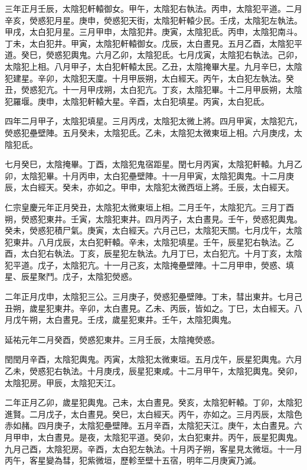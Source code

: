 \begin{pinyinscope}
 三年正月壬辰，太陰犯軒轅御女。甲午，太陰犯右執法。丙申，太陰犯平道。二月辛亥，熒惑犯月星。庚申，熒惑犯天街，太陰犯軒轅少民。壬戌，太陰犯左執法。甲戌，太白犯月星。三月甲申，太陰犯井。庚寅，太陰犯氐。丙申，太陰犯南斗。丁未，太白犯井。甲寅，太陰犯軒轅御女。戊辰，太白晝見。五月乙酉，太陰犯平道。癸巳，熒惑犯輿鬼。六月乙卯，太陰犯氐。七月戊寅，太陰犯右執法。己卯，太陰犯上相。八月甲子，太白犯軒轅太民。乙丑，太陰掩畢大星。九月辛巳，太陰犯建星。辛卯，太陰犯天廩。十月甲辰朔，太白經天。丙午，太白犯左執法。癸丑，熒惑犯亢。十一月甲戌朔，太白犯亢。丁亥，太陰犯畢。十二月甲辰朔，太陰犯羅堰。庚申，太陰犯軒轅大星。辛酉，太白犯填星。丙寅，太白犯氐。



 四年二月甲子，太陰犯填星。三月丙戌，太陰犯太微上將。四月甲寅，太陰犯亢，熒惑犯壘壁陣。五月癸未，太陰犯氐。乙未，太陰犯太微東垣上相。六月庚戌，太陰犯氐。



 七月癸巳，太陰掩畢。丁酉，太陰犯鬼宿距星。閏七月丙寅，太陰犯軒轅。九月乙卯，太陰犯畢。十月丙申，太白犯壘壁陣。十一月甲寅，太陰犯輿鬼。十二月庚辰，太白經天。癸未，亦如之。甲申，太陰犯太微西垣上將。壬辰，太白經天。



 仁宗皇慶元年正月癸丑，太陰犯太微東垣上相。二月壬午，太陰犯亢。三月丁酉朔，熒惑犯東井。壬寅，太陰犯東井。四月丙子，太白晝見。壬午，熒惑犯輿鬼。癸未，熒惑犯積尸氣。庚寅，太白經天。六月己巳，太陰犯天關。七月戊午，太陰犯東井。八月戊辰，太白犯軒轅。辛未，太陰犯填星。壬午，辰星犯右執法。乙酉，太白犯右執法。丁亥，辰星犯左執法。九月丁巳，太白犯亢。十月丁亥，太陰犯平道。戊子，太陰犯亢。十一月己亥，太陰掩壘壁陣。十二月甲申，熒惑、填星、辰星聚鬥。戊子，太陰犯熒惑。



 二年正月戊申，太陰犯三公。三月庚子，熒惑犯壘壁陣。丁未，彗出東井。七月己丑朔，歲星犯東井。辛卯，太白晝見。乙未、丙辰，皆如之。丁巳，太白經天。八月戊午朔，太白晝見。壬戌，歲星犯東井。壬午，太陰犯輿鬼。



 延祐元年二月癸酉，熒惑犯東井。三月壬辰，太陰掩熒惑。



 閏閏月辛酉，太陰犯輿鬼。丙寅，太陰犯太微東垣。五月戊午，辰星犯輿鬼。六月乙未，熒惑犯右執法。十月庚戌，辰星犯東咸。十二月甲午，太陰犯輿鬼。癸卯，太陰犯房。甲辰，太陰犯天江。



 二年正月乙卯，歲星犯輿鬼。己未，太白晝見。癸亥，太陰犯軒轅。丁卯，太陰犯進賢。二月戊子，太白晝見。癸巳，太白經天。丙午，亦如之。三月丙辰，太陰色赤如赭。四月庚子，太陰犯壘壁陣。五月辛酉，太陰犯天江。庚午，太白晝見。六月甲申，太白晝見。是夜，太陰犯平道。癸卯，太白犯東井。丙午，辰星犯輿鬼。九月己酉，太陰犯房。辛酉，太白犯左執法。十月丙子朔，客星見太微垣。十一月丙午，客星變為彗，犯紫微垣，歷軫至壁十五宿，明年二月庚寅乃滅。




\end{pinyinscope}

